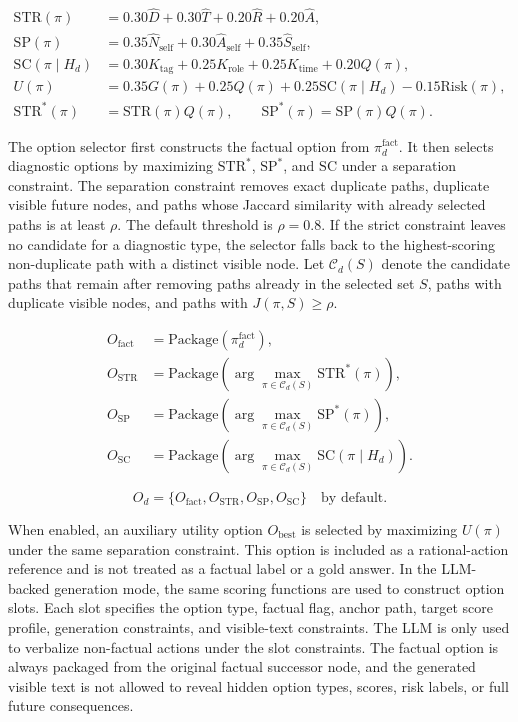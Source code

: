\documentclass[pdflatex,sn-mathphys-num]{sn-jnl}%
\theoremstyle{thmstyleone}%
\theoremstyle{thmstyletwo}%
\theoremstyle{thmstylethree}%
\begin{document}
\begin{align}
\mathrm{STR}(\pi)&=0.30\widehat{D}+0.30\widehat{T}+0.20\widehat{R}+0.20\widehat{A},\\
\mathrm{SP}(\pi)&=0.35\widehat{N}_{\mathrm{self}}+0.30\widehat{A}_{\mathrm{self}}+0.35\widehat{S}_{\mathrm{self}},\\
\mathrm{SC}(\pi\mid H_d)&=0.30K_{\mathrm{tag}}+0.25K_{\mathrm{role}}+0.25K_{\mathrm{time}}+0.20Q(\pi),\\
U(\pi)&=0.35G(\pi)+0.25Q(\pi)+0.25\mathrm{SC}(\pi\mid H_d)-0.15\mathrm{Risk}(\pi),\\
\mathrm{STR}^{*}(\pi)&=\mathrm{STR}(\pi)Q(\pi),\qquad
\mathrm{SP}^{*}(\pi)=\mathrm{SP}(\pi)Q(\pi).
\end{align}

The option selector first constructs the factual option from $\pi_d^{\mathrm{fact}}$. It then selects diagnostic options by maximizing $\mathrm{STR}^{*}$, $\mathrm{SP}^{*}$, and $\mathrm{SC}$ under a separation constraint. The separation constraint removes exact duplicate paths, duplicate visible future nodes, and paths whose Jaccard similarity with already selected paths is at least $\rho$. The default threshold is $\rho=0.8$. If the strict constraint leaves no candidate for a diagnostic type, the selector falls back to the highest-scoring non-duplicate path with a distinct visible node. Let $\mathcal{C}_d(S)$ denote the candidate paths that remain after removing paths already in the selected set $S$, paths with duplicate visible nodes, and paths with $J(\pi,S)\ge \rho$.

\begin{align}
O_{\mathrm{fact}}&=\mathrm{Package}(\pi_d^{\mathrm{fact}}),\\
O_{\mathrm{STR}}&=\mathrm{Package}\!\left(\arg\max_{\pi\in\mathcal{C}_d(S)}\mathrm{STR}^{*}(\pi)\right),\\
O_{\mathrm{SP}}&=\mathrm{Package}\!\left(\arg\max_{\pi\in\mathcal{C}_d(S)}\mathrm{SP}^{*}(\pi)\right),\\
O_{\mathrm{SC}}&=\mathrm{Package}\!\left(\arg\max_{\pi\in\mathcal{C}_d(S)}\mathrm{SC}(\pi\mid H_d)\right).
\end{align}


\begin{equation}
O_d=\{O_{\mathrm{fact}},O_{\mathrm{STR}},O_{\mathrm{SP}},O_{\mathrm{SC}}\}
\quad\text{by default.}
\end{equation}

When enabled, an auxiliary utility option $O_{\mathrm{best}}$ is selected by maximizing $U(\pi)$ under the same separation constraint. This option is included as a rational-action reference and is not treated as a factual label or a gold answer.
In the LLM-backed generation mode, the same scoring functions are used to construct option slots. Each slot specifies the option type, factual flag, anchor path, target score profile, generation constraints, and visible-text constraints. The LLM is only used to verbalize non-factual actions under the slot constraints. The factual option is always packaged from the original factual successor node, and the generated visible text is not allowed to reveal hidden option types, scores, risk labels, or full future consequences.
\end{document}
